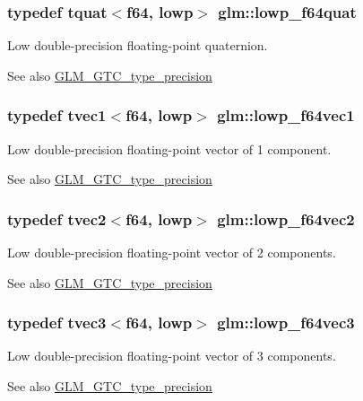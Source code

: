 \subsubsection[{lowp\+\_\+f64quat}]{\setlength{\rightskip}{0pt plus 5cm}typedef {\bf tquat}$<${\bf f64}, lowp$>$ {\bf glm\+::lowp\+\_\+f64quat}}\label{namespaceglm_a0006c2206d9675a73e5e9e8fd29e1dc2}
Low double-\/precision floating-\/point quaternion. \begin{DoxySeeAlso}{See also}
\hyperlink{group__gtc__type__precision}{G\+L\+M\+\_\+\+G\+T\+C\+\_\+type\+\_\+precision} 
\end{DoxySeeAlso}
\hypertarget{namespaceglm_a7072d075ab07dfb7c9a4a900e66b3a0d}{}
\subsubsection[{lowp\+\_\+f64vec1}]{\setlength{\rightskip}{0pt plus 5cm}typedef tvec1$<${\bf f64}, lowp$>$ {\bf glm\+::lowp\+\_\+f64vec1}}\label{namespaceglm_a7072d075ab07dfb7c9a4a900e66b3a0d}
Low double-\/precision floating-\/point vector of 1 component. \begin{DoxySeeAlso}{See also}
\hyperlink{group__gtc__type__precision}{G\+L\+M\+\_\+\+G\+T\+C\+\_\+type\+\_\+precision} 
\end{DoxySeeAlso}
\hypertarget{namespaceglm_a480854bac14ae0e412e76604b52d82ac}{}
\subsubsection[{lowp\+\_\+f64vec2}]{\setlength{\rightskip}{0pt plus 5cm}typedef tvec2$<${\bf f64}, lowp$>$ {\bf glm\+::lowp\+\_\+f64vec2}}\label{namespaceglm_a480854bac14ae0e412e76604b52d82ac}
Low double-\/precision floating-\/point vector of 2 components. \begin{DoxySeeAlso}{See also}
\hyperlink{group__gtc__type__precision}{G\+L\+M\+\_\+\+G\+T\+C\+\_\+type\+\_\+precision} 
\end{DoxySeeAlso}
\hypertarget{namespaceglm_adc4bd8cc4f9c7cca810ca8655d276a2c}{}
\subsubsection[{lowp\+\_\+f64vec3}]{\setlength{\rightskip}{0pt plus 5cm}typedef tvec3$<${\bf f64}, lowp$>$ {\bf glm\+::lowp\+\_\+f64vec3}}\label{namespaceglm_adc4bd8cc4f9c7cca810ca8655d276a2c}
Low double-\/precision floating-\/point vector of 3 components. \begin{DoxySeeAlso}{See also}
\hyperlink{group__gtc__type__precision}{G\+L\+M\+\_\+\+G\+T\+C\+\_\+type\+\_\+precision} 
\end{DoxySeeAlso}
\hypertarget{namespaceglm_a11fc85d24a8ea1cfae7a4b3f88e1644a}{}
